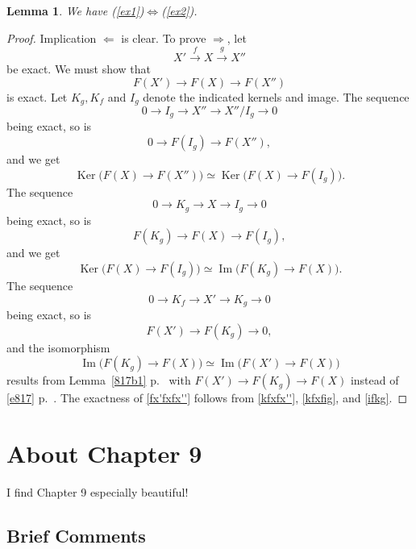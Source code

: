 \documentclass[12pt]{article}
\newtheorem{lem}[thm]{Lemma}
\theoremstyle{remark}
\theoremstyle{definition}
\newcommand{\si}{\Leftarrow}
\newcommand{\ssi}{\Leftrightarrow}
\newcommand{\then}{\Rightarrow}
\newcommand{\xr}{\xrightarrow}
\DeclareMathOperator{\Ima}{Im}
\DeclareMathOperator{\Ker}{Ker}
\begin{document}
\begin{lem}\label{817b}
We have (\ref{ex1})$\ssi$(\ref{ex2}).
\end{lem}

\begin{proof}
Implication $\si$ is clear. To prove $\then$, let 
$$
X'\xr fX\xr gX''
$$
be exact. We must show that 
%
\begin{equation}\label{fx'fxfx''}
F(X')\to F(X)\to F(X'')
\end{equation} 
% 
is exact. Let $K_g,K_f$ and $I_g$ denote the indicated kernels and image. The sequence 
$$ 
0\to I_g\to X''\to X''/I_g\to 0
$$ 
being exact, so is 
$$ 
0\to F(I_g)\to F(X''), 
$$ 
and we get 
%
\begin{equation}\label{kfxfx''}
\Ker\big(F(X)\to F(X'')\big)\simeq\Ker\big(F(X)\to F(I_g)\big). 
\end{equation} 
% 
The sequence 
$$ 
0\to K_g\to X\to I_g\to 0
$$ 
being exact, so is 
$$ 
F(K_g)\to F(X)\to F(I_g), 
$$ 
and we get 
%
\begin{equation}\label{kfxfig}
\Ker\big(F(X)\to F(I_g)\big)\simeq\Ima\big(F(K_g)\to F(X)\big). 
\end{equation} 
% 
The sequence 
$$ 
0\to K_f\to X'\to K_g\to 0 
$$ 
being exact, so is 
$$ 
F(X')\to F(K_g)\to0,  
$$ 
and the isomorphism 
%
\begin{equation}\label{ifkg}
\Ima\big(F(K_g)\to F(X)\big)\simeq\Ima\big(F(X')\to F(X)\big)  
\end{equation} 
% 
results from Lemma~\ref{817b1} p.~\pageref{817b1} with $F(X')\to F(K_g)\to F(X)$ instead of \eqref{e817} p.~\pageref{e817}. The exactness of \eqref{fx'fxfx''} follows from \eqref{kfxfx''}, \eqref{kfxfig}, and \eqref{ifkg}.
\end{proof} 


\section{About Chapter 9}

I find Chapter 9 especially beautiful!

\subsection{Brief Comments}
\end{document}
